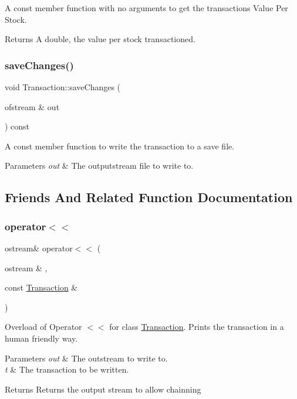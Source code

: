 A const member function with no arguments to get the transaction\textquotesingle{}s Value Per Stock. \begin{DoxyReturn}{Returns}
A double, the value per stock transactioned. 
\end{DoxyReturn}
\mbox{\label{class_transaction_a3c0c3c4a64c5b3d20c420708357a86be}} 
\subsubsection{\texorpdfstring{save\+Changes()}{saveChanges()}}
{\footnotesize\ttfamily void Transaction\+::save\+Changes (\begin{DoxyParamCaption}\item[{ofstream \&}]{out }\end{DoxyParamCaption}) const}

A const member function to write the transaction to a save file. 
\begin{DoxyParams}{Parameters}
{\em out} & The outputstream file to write to. \\
\hline
\end{DoxyParams}


\subsection{Friends And Related Function Documentation}
\mbox{\label{class_transaction_a8d6d6be74010b57302f4567e06cdbed3}} 
\subsubsection{\texorpdfstring{operator$<$$<$}{operator<<}}
{\footnotesize\ttfamily ostream\& operator$<$$<$ (\begin{DoxyParamCaption}\item[{ostream \&}]{,  }\item[{const \hyperlink{class_transaction}{Transaction} \&}]{ }\end{DoxyParamCaption})\hspace{0.3cm}{\ttfamily [friend]}}

Overload of Operator $<$$<$ for class \hyperlink{class_transaction}{Transaction}. Prints the transaction in a human friendly way. 
\begin{DoxyParams}{Parameters}
{\em out} & The outstream to write to. \\
\hline
{\em t} & The transaction to be written. \\
\hline
\end{DoxyParams}
\begin{DoxyReturn}{Returns}
Returns the output stream to allow chainning 
\end{DoxyReturn}


